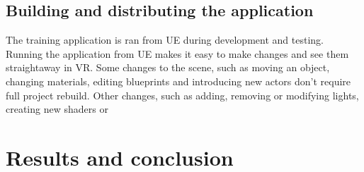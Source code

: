 \documentclass[12pt, a4paper,oneside, nocenter]{thesis}
\begin{document}
\section{Building and distributing the application}
The training application is ran from UE during development and testing. Running the application from UE makes it easy to make changes and see them straightaway in VR. Some changes to the scene, such as moving an object, changing materials, editing blueprints and introducing new actors don't require full project rebuild. Other changes, such as adding, removing or modifying lights, creating new shaders or  
\par
\chapter{\texorpdfstring{Results and conclusion}{results-conclusion}}

\newpage

\nocite{*}

\end{document}
